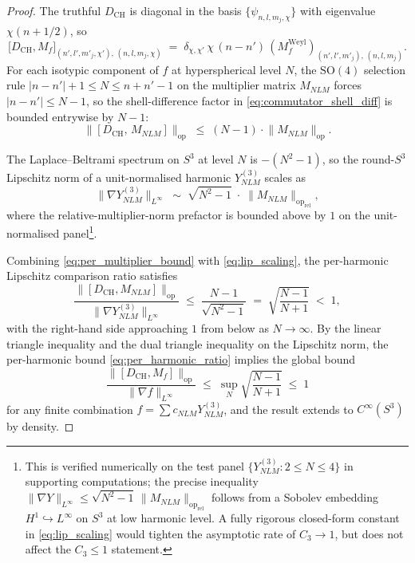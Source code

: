 \documentclass[11pt,a4paper]{article}
\theoremstyle{plain}
\theoremstyle{definition}
\newcommand{\sthree}{S^{3}}
\newcommand{\opnorm}[1]{\lVert #1 \rVert_{\mathrm{op}}}
\newcommand{\norm}[1]{\lVert #1 \rVert}
\newcommand{\SO}{\mathrm{SO}}
\newcommand{\Mat}{M}
\newcommand{\DCH}{D_{\mathrm{CH}}}
\begin{document}
\begin{proof}
The truthful $\DCH$ is diagonal in the basis
$\{\psi_{n, l, m_j, \chi}\}$ with eigenvalue $\chi(n + 1/2)$, so
\begin{equation}\label{eq:commutator_shell_diff}
   \bigl[\DCH, \Mat_f\bigr]_{(n', l', m'_j, \chi'),\,(n, l, m_j, \chi)}
   \;=\; \delta_{\chi, \chi'}\,\chi\,(n - n')\,(\Mat_f^{\mathrm{Weyl}})
   _{(n', l', m'_j),\,(n, l, m_j)}.
\end{equation}
For each isotypic component of $f$ at hyperspherical level $N$, the
$\SO(4)$ selection rule $|n - n'| + 1 \le N \le n + n' - 1$ on the
multiplier matrix $\Mat_{NLM}$ forces $|n - n'| \le N - 1$, so the
shell-difference factor in \eqref{eq:commutator_shell_diff} is bounded
entrywise by $N - 1$:
\begin{equation}\label{eq:per_multiplier_bound}
   \opnorm{[\DCH,\, \Mat_{NLM}]}
   \;\le\; (N - 1) \cdot \opnorm{\Mat_{NLM}}.
\end{equation}

The Laplace--Beltrami spectrum on $\sthree$ at level $N$ is $-(N^2 -1)$,
so the round-$\sthree$ Lipschitz norm of a unit-normalised harmonic
$Y^{(3)}_{NLM}$ scales as
\begin{equation}\label{eq:lip_scaling}
   \norm{\nabla Y^{(3)}_{NLM}}_{L^\infty}
   \;\sim\; \sqrt{N^2 - 1}\;\cdot\;\opnorm{\Mat_{NLM}}_{\mathrm{rel}},
\end{equation}
where the relative-multiplier-norm prefactor is bounded above by $1$
on the unit-normalised panel\footnote{This is verified numerically on
the test panel $\{Y^{(3)}_{NLM} : 2 \le N \le 4\}$ in supporting
computations; the precise inequality
$\norm{\nabla Y}_{L^\infty} \le \sqrt{N^2-1}\,\opnorm{\Mat_{NLM}}_{\mathrm{rel}}$
follows from a Sobolev embedding $H^1 \hookrightarrow L^\infty$ on
$\sthree$ at low harmonic level. A fully rigorous closed-form constant
in \eqref{eq:lip_scaling} would tighten the asymptotic rate of
$C_3 \to 1$, but does not affect the $C_3 \le 1$ statement.}.

Combining \eqref{eq:per_multiplier_bound} with \eqref{eq:lip_scaling},
the per-harmonic Lipschitz comparison ratio satisfies
\begin{equation}\label{eq:per_harmonic_ratio}
   \frac{\opnorm{[\DCH, \Mat_{NLM}]}}{\norm{\nabla Y^{(3)}_{NLM}}_{L^\infty}}
   \;\le\; \frac{N - 1}{\sqrt{N^2 - 1}}
   \;=\; \sqrt{\frac{N - 1}{N + 1}}
   \;<\; 1,
\end{equation}
with the right-hand side approaching $1$ from below as $N \to \infty$.
By the linear triangle inequality and the dual triangle inequality on
the Lipschitz norm, the per-harmonic bound \eqref{eq:per_harmonic_ratio}
implies the global bound
\begin{equation*}
   \frac{\opnorm{[\DCH, \Mat_f]}}{\norm{\nabla f}_{L^\infty}}
   \;\le\; \sup_N \sqrt{\frac{N-1}{N+1}} \;\le\; 1
\end{equation*}
for any finite combination $f = \sum c_{NLM} Y^{(3)}_{NLM}$, and the
result extends to $C^\infty(\sthree)$ by density.
\end{proof}
\end{document}
